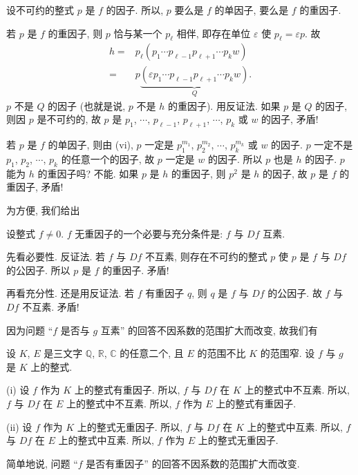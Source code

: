 \begin{pf}
    设不可约的整式 $p$ 是 $f$ 的因子. 所以, $p$ 要么是 $f$ 的单因子, 要么是 $f$ 的重因子.

    若 $p$ 是 $f$ 的重因子, 则 $p$ 恰与某一个 $p_\ell$ 相伴, 即存在单位 $\varepsilon$ 使 $p_\ell = \varepsilon p$. 故
    \begin{align*}
        h
        = {} & p_\ell (p_1 \cdots p_{\ell - 1} p_{\ell + 1} \cdots p_k w)                          \\
        = {} & p \underbrace{(\varepsilon p_1 \cdots p_{\ell - 1} p_{\ell + 1} \cdots p_k w)}_{Q}.
    \end{align*}
    $p$ 不是 $Q$ 的因子 (也就是说, $p$ 不是 $h$ 的重因子). 用反证法. 如果 $p$ 是 $Q$ 的因子, 则因 $p$ 是不可约的, 故 $p$ 是 $p_1$, $\cdots$, $p_{\ell - 1}$, $p_{\ell + 1}$, $\cdots$, $p_k$ 或 $w$ 的因子, 矛盾!

    若 $p$ 是 $f$ 的单因子, 则由 (vi), $p$ 一定是 $p_1^{m_1}$, $p_2^{m_2}$, $\cdots$, $p_k^{m_k}$ 或 $w$ 的因子. $p$ 一定不是 $p_1$, $p_2$, $\cdots$, $p_k$ 的任意一个的因子, 故 $p$ 一定是 $w$ 的因子. 所以 $p$ 也是 $h$ 的因子. $p$ 能为 $h$ 的重因子吗? 不能. 如果 $p$ 是 $h$ 的重因子, 则 $p^2$ 是 $h$ 的因子, 故 $p$ 是 $f$ 的重因子, 矛盾!
\end{pf}

为方便, 我们给出
\begin{proposition}
    设整式 $f \neq 0$. $f$ 无重因子的一个必要与充分条件是: $f$ 与 $Df$ 互素.
\end{proposition}

\begin{pf}
    先看必要性. 反证法. 若 $f$ 与 $Df$ 不互素, 则存在不可约的整式 $p$ 使 $p$ 是 $f$ 与 $Df$ 的公因子. 所以 $p$ 是 $f$ 的重因子. 矛盾!

    再看充分性. 还是用反证法. 若 $f$ 有重因子 $q$, 则 $q$ 是 $f$ 与 $Df$ 的公因子. 故 $f$ 与 $Df$ 不互素. 矛盾!
\end{pf}

因为问题 ``$f$ 是否与 $g$ 互素'' 的回答不因系数的范围扩大而改变, 故我们有
\begin{proposition}
    设 $K$, $E$ 是三文字 $\mathbb{Q}$, $\mathbb{R}$, $\mathbb{C}$ 的任意二个, 且 $E$ 的范围不比 $K$ 的范围窄. 设 $f$ 与 $g$ 是 $K$ 上的整式.

    (i) 设 $f$ 作为 $K$ 上的整式有重因子. 所以, $f$ 与 $Df$ 在 $K$ 上的整式中不互素. 所以, $f$ 与 $Df$ 在 $E$ 上的整式中不互素. 所以, $f$ 作为 $E$ 上的整式有重因子.

    (ii) 设 $f$ 作为 $K$ 上的整式无重因子. 所以, $f$ 与 $Df$ 在 $K$ 上的整式中互素. 所以, $f$ 与 $Df$ 在 $E$ 上的整式中互素. 所以, $f$ 作为 $E$ 上的整式无重因子.

    简单地说, 问题 ``$f$ 是否有重因子'' 的回答不因系数的范围扩大而改变.
\end{proposition}

